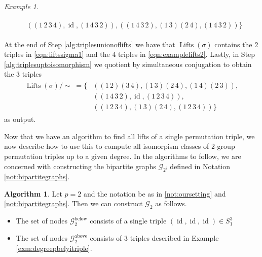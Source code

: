 \documentclass{dcthesis}
\DeclareMathOperator{\Lifts}{Lifts}
\DeclareMathOperator{\id}{id}
\numberwithin{equation}{section}
\theoremstyle{definition}
\newtheorem{alg}[equation]{Algorithm}
\theoremstyle{remark}
\newtheorem{example}[equation]{Example}
\begin{document}
{{{\begin{example}
\begin{itemize}
\begin{align}
\begin{split}
            &((1\,2\,3\,4), \id, (1\,4\,3\,2)),
              ((1\,4\,3\,2), (1\,3)(2\,4), (1\,4\,3\,2))
            \Big\}
            \end{split}
          \end{align}
      \end{itemize}
      At the end of
      Step \ref{alg:triplesunionoflifts}
      we have that
      $\Lifts(\sigma)$
      contains the $2$ triples in
      \eqref{eqn:liftssigma1}
      and the $4$ triples in
      \eqref{eqn:examplelifts2}.
      Lastly, in Step
      \ref{alg:triplesuptoisomorphism}
      we quotient by simultaneous conjugation
      to obtain the $3$ triples
      \begin{align}
        \label{eqn:exampleoutput}
        \begin{split}
          \Lifts(\sigma)/\!\!\sim
          \;=\Big\{
            &((1\,2)(3\,4),(1\,3)(2\,4),(1\,4)(2\,3)),\\
            &((1\,4\,3\,2),\id,(1\,2\,3\,4)),\\
            &((1\,2\,3\,4),(1\,3)(2\,4),(1\,2\,3\,4))
          \Big\}
        \end{split}
      \end{align}
      as output.
    \end{example}
    Now that we have an algorithm to
    find all lifts of a single
    permutation triple,
    we now describe how to use this
    to compute all isomorpism classes
    of $2$-group permutation triples
    up to a given degree.
    In the algorithms to follow,
    we are concerned with constructing
    the bipartite graphs
    $\mathscr{G}_{2^i}$
    defined in
    Notation \ref{not:bipartitegraphs}.
    \begin{alg}
      \label{alg:alltriplesbasecase}
      Let $p=2$ and the notation be as in
      \ref{not:oursetting} and
      \ref{not:bipartitegraphs}.
      Then we can construct
      $\mathscr{G}_2$ as follows.
      \begin{itemize}
        \item
          \label{alg:alltriplesbasecasebelow}
          The set of nodes
          $\mathscr{G}_2^\text{below}$
          consists of a single triple
          $(\id,\id,\id)\in S_1^3$
        \item
          \label{alg:alltriplesbasecaseabove}
          The set of nodes
          $\mathscr{G}_2^\text{above}$
          consists of $3$ triples
          described in
          Example
          \ref{exm:degreepbelyitriple}.

\end{itemize}
\end{alg}}}}
\end{document}
